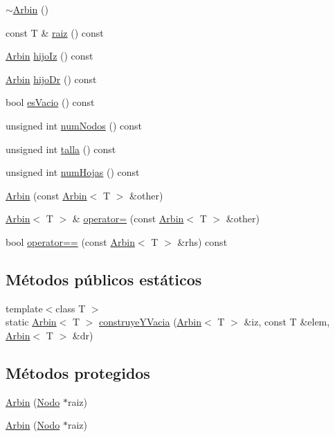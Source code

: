 \begin{DoxyCompactItemize}
\item 
\hyperlink{class_arbin_a9045fbb22bb9e6a59deab2bf6f69e879}{$\sim$\-Arbin} ()
\item 
const \-T \& \hyperlink{class_arbin_a954e86d83269c6166bb21fd032914622}{raiz} () const 
\item 
\hyperlink{class_arbin}{\-Arbin} \hyperlink{class_arbin_a1ab4f143c3db9e6cb6c7c0c1bba18a6b}{hijo\-Iz} () const 
\item 
\hyperlink{class_arbin}{\-Arbin} \hyperlink{class_arbin_a0ca95be8314f9837667b86bd646aec8c}{hijo\-Dr} () const 
\item 
bool \hyperlink{class_arbin_ac82861483558c565d174a3afffd4778c}{es\-Vacio} () const 
\item 
unsigned int \hyperlink{class_arbin_a7167b5d88652581c404e3c3fc49177cb}{num\-Nodos} () const 
\item 
unsigned int \hyperlink{class_arbin_a875a7e020e2cf5c42dfeed73519c7ce4}{talla} () const 
\item 
unsigned int \hyperlink{class_arbin_aed6e1397e19b444f37f104cd76e235f9}{num\-Hojas} () const 
\item 
\hyperlink{class_arbin_a6a33e5b960e6b67eb906e86839d213ed}{\-Arbin} (const \hyperlink{class_arbin}{\-Arbin}$<$ \-T $>$ \&other)
\item 
\hyperlink{class_arbin}{\-Arbin}$<$ \-T $>$ \& \hyperlink{class_arbin_a20d48b162271c62a79adec950e779e0e}{operator=} (const \hyperlink{class_arbin}{\-Arbin}$<$ \-T $>$ \&other)
\item 
bool \hyperlink{class_arbin_af848201d495953438d4408ba7cc1c29d}{operator==} (const \hyperlink{class_arbin}{\-Arbin}$<$ \-T $>$ \&rhs) const 
\end{DoxyCompactItemize}
\subsection*{\-Métodos públicos estáticos}
\begin{DoxyCompactItemize}
\item 
{\footnotesize template$<$class T $>$ }\\static \hyperlink{class_arbin}{\-Arbin}$<$ \-T $>$ \hyperlink{class_arbin_a5ba0a835f2495e62ff01cc51cff571f8}{construye\-Y\-Vacia} (\hyperlink{class_arbin}{\-Arbin}$<$ \-T $>$ \&iz, const \-T \&elem, \hyperlink{class_arbin}{\-Arbin}$<$ \-T $>$ \&dr)
\end{DoxyCompactItemize}
\subsection*{\-Métodos protegidos}
\begin{DoxyCompactItemize}
\item 
\hyperlink{class_arbin_a6105b3b549bfc3b69d48301d48f17072}{\-Arbin} (\hyperlink{class_arbin_1_1_nodo}{\-Nodo} $\ast$raiz)
\item 
\hyperlink{class_arbin_a6105b3b549bfc3b69d48301d48f17072}{\-Arbin} (\hyperlink{class_arbin_1_1_nodo}{\-Nodo} $\ast$raiz)
\end{DoxyCompactItemize}
